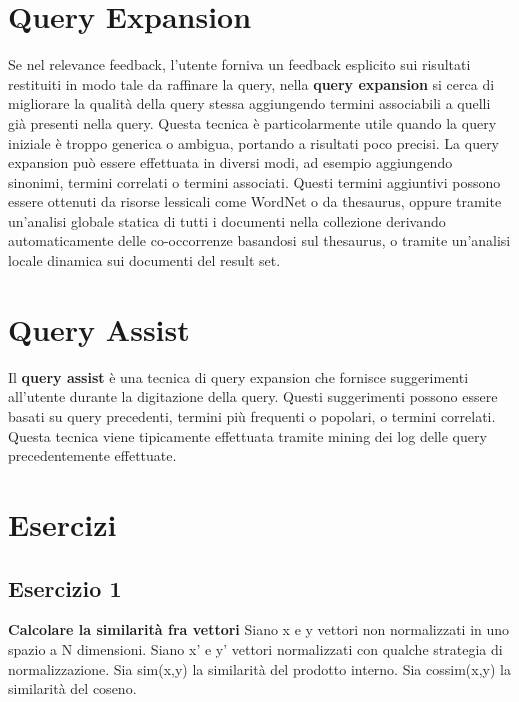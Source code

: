 \documentclass{report}
\begin{document}
	\section{Query Expansion}
	Se nel relevance feedback, l'utente forniva un feedback esplicito sui risultati restituiti in modo tale da raffinare la query, nella \textbf{query expansion} si cerca di migliorare la qualità della query stessa aggiungendo termini associabili a quelli già presenti nella query. Questa tecnica è particolarmente utile quando la query iniziale è troppo generica o ambigua, portando a risultati poco precisi. La query expansion può essere effettuata in diversi modi, ad esempio aggiungendo sinonimi, termini correlati o termini associati. Questi termini aggiuntivi possono essere ottenuti da risorse lessicali come WordNet o da thesaurus, oppure tramite un'analisi globale statica di tutti i documenti nella collezione derivando automaticamente delle co-occorrenze basandosi sul thesaurus, o tramite un'analisi locale dinamica sui documenti del result set.

	\section{Query Assist}
	Il \textbf{query assist} è una tecnica di query expansion che fornisce suggerimenti all'utente durante la digitazione della query. Questi suggerimenti possono essere basati su query precedenti, termini più frequenti o popolari, o termini correlati. Questa tecnica viene tipicamente effettuata tramite mining dei log delle query precedentemente effettuate.
	
	\newpage
	\section{Esercizi}
	\subsection*{Esercizio 1}
	\textbf{Calcolare la similarità fra vettori}
	Siano x e y vettori non normalizzati in uno spazio a N dimensioni. Siano x' e y' vettori normalizzati con qualche strategia di normalizzazione. Sia sim(x,y) la similarità del prodotto interno. Sia cossim(x,y) la similarità del coseno. 
\end{document}
